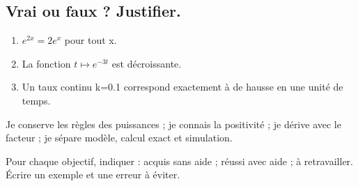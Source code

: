 \subsection*{Vrai ou faux ? Justifier.}\label{C09-VF}
\begin{enumerate}
\item $e^{2x}=2e^x$ pour tout x.
\item La fonction $t\mapsto e^{-3t}$ est décroissante.
\item Un taux continu k=\num{0,1} correspond exactement à  de hausse en une unité de temps.
\end{enumerate}
\begin{keypoint}Je conserve les règles des puissances ; je connais la positivité ; je dérive avec le facteur ; je sépare modèle, calcul exact et simulation.

Pour chaque objectif, indiquer : acquis sans aide ; réussi avec aide ; à retravailler. Écrire un exemple et une erreur à éviter.\end{keypoint}
\endgroup
\ifmxteacher{}\fi
